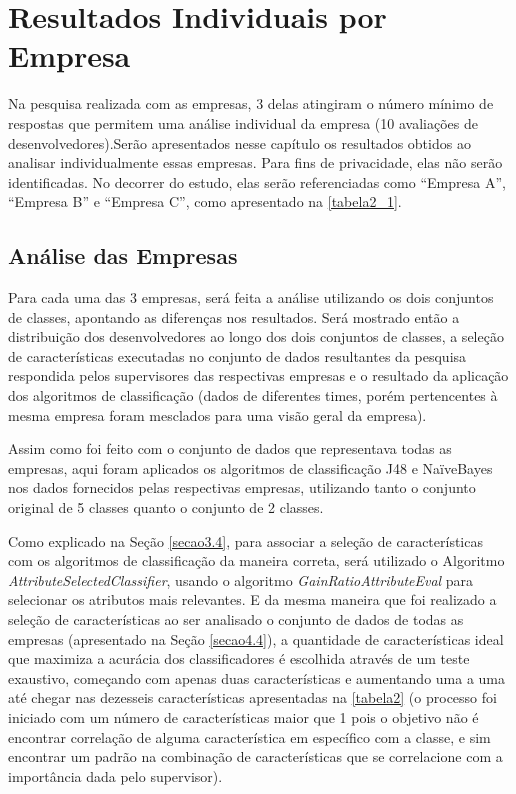 \chapter[Resultados Individuais por Empresa]{Resultados Individuais por Empresa}

Na pesquisa realizada com as empresas, 3 delas atingiram o número mínimo de respostas que permitem uma análise individual da empresa (10 avaliações de desenvolvedores).Serão apresentados nesse capítulo os resultados obtidos ao analisar individualmente essas empresas. Para fins de privacidade, elas não serão identificadas. No decorrer do estudo, elas serão referenciadas como ``Empresa A'', ``Empresa B'' e ``Empresa C'', como apresentado na \autoref{tabela2_1}.

\section{Análise das Empresas}

Para cada uma das 3 empresas, será feita a análise utilizando os dois conjuntos de classes, apontando as diferenças nos resultados. Será mostrado então a distribuição dos desenvolvedores ao longo dos dois conjuntos de classes, a seleção de características executadas no conjunto de dados resultantes da pesquisa respondida pelos supervisores das respectivas empresas e o resultado da aplicação dos algoritmos de classificação (dados de diferentes times, porém pertencentes à mesma empresa foram mesclados para uma visão geral da empresa).

Assim como foi feito com o conjunto de dados que representava todas as empresas, aqui foram aplicados os algoritmos de classificação J48 e NaïveBayes nos dados fornecidos pelas respectivas empresas, utilizando tanto o conjunto original de 5 classes quanto o conjunto de 2 classes. 

Como explicado na Seção \ref{secao3.4}, para associar a seleção de características com os algoritmos de classificação da maneira correta, será utilizado o Algoritmo \textit{AttributeSelectedClassifier}, usando o algoritmo \textit{GainRatioAttributeEval} para selecionar os atributos mais relevantes. E da mesma maneira que foi realizado a seleção de características ao ser analisado o conjunto de dados de todas as empresas (apresentado na Seção \ref{secao4.4}), a quantidade de características ideal que maximiza a acurácia dos classificadores é escolhida através de um teste exaustivo, começando com apenas duas características e aumentando uma a uma até chegar nas dezesseis características apresentadas na \autoref{tabela2} (o processo foi iniciado com um número de características maior que 1 pois o objetivo não é encontrar correlação de alguma característica em específico com a classe, e sim encontrar um padrão na combinação de características que se correlacione com a importância dada pelo supervisor).

